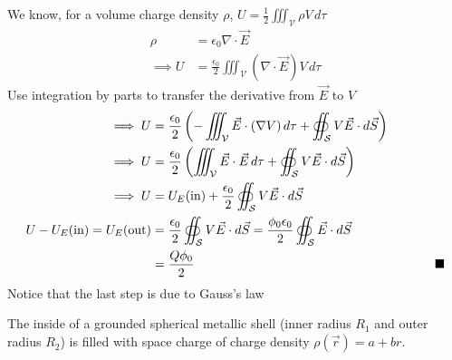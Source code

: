 \documentclass[../main.tex]{subfiles}
\begin{document}
\begin{questions}
\begin{solution}
	We know, for a volume charge density $\rho$, $U = \frac{1}{2}\iiint_{\mathcal{V}} \rho V\,d\tau$
	\begin{align}
		\rho &= \epsilon_0\nabla\cdot\vec{E} \\
		\implies U &= \frac{\epsilon_0}{2} \iiint_{\mathcal{V}} (\nabla\cdot \vec{E})V\,d\tau
	\end{align}
	Use integration by parts to transfer the derivative from $\vec{E}$ to $V$
	\begin{align}
		\implies U &= \frac{\epsilon_0}{2} \left(-\iiint_{\mathcal{V}} \vec{E}\cdot(\nabla V)\,d\tau + \oiint_{\mathcal{S}} V\vec{E}\cdot d\vec{S}\right) \\
		\implies U &= \frac{\epsilon_0}{2} \left(\iiint_{\mathcal{V}} \vec{E}\cdot\vec{E}\,d\tau + \oiint_{\mathcal{S}} V\vec{E}\cdot d\vec{S}\right) \\
		\implies U &= U_E(\text{in}) + \frac{\epsilon_0}{2}\oiint_{\mathcal{S}} V\vec{E}\cdot d\vec{S} \\
		U-U_E(\text{in}) = U_E(\text{out}) &= \frac{\epsilon_0}{2}\oiint_{\mathcal{S}} V\vec{E}\cdot d\vec{S} = \frac{\phi_0\epsilon_0}{2}\oiint_{\mathcal{S}} \vec{E}\cdot d\vec{S} \\
		&= \frac{Q\phi_0}{2} \hskip0.55\textwidth\blacksquare
	\end{align}
	Notice that the last step is due to Gauss's law
\end{solution}

\question The inside of a grounded spherical metallic shell (inner radius $R_1$ and outer radius $R_2$) is filled with space charge of charge density $\rho(\vec{r}) = a+br$.
\end{questions}
\end{document}
